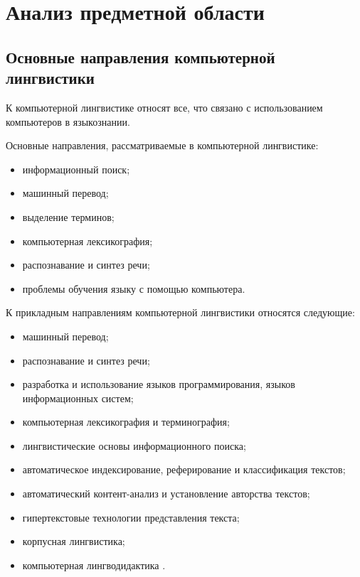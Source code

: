 \chapter{Анализ предметной области}

\section{Основные направления компьютерной \newline лингвистики}

К компьютерной лингвистике относят все, что связано с использованием компьютеров в языкознании. 

Основные направления, рассматриваемые в компьютерной лингвистике:

\begin{itemize}[label=---]
        \item информационный поиск;
        \item машинный перевод;
        \item выделение терминов;
        \item компьютерная лексикография;
        \item распознавание и синтез речи;
        \item проблемы обучения языку с помощью
    компьютера.
\end{itemize}

К прикладным направлениям компьютерной лингвистики относятся следующие:

\begin{itemize}[label=---]
        \item машинный перевод;
        \item распознавание и синтез речи;
        \item разработка и использование языков программирования, языков информационных систем;
        \item компьютерная лексикография и терминография;
        \item лингвистические основы информационного поиска;
        \item автоматическое индексирование, реферирование и классификация текстов;
        \item автоматический контент-анализ и установление авторства текстов;
        \item гипертекстовые технологии представления
        текста;
        \item корпусная лингвистика;
        \item компьютерная лингводидактика \cite{umarov}.
\end{itemize}

